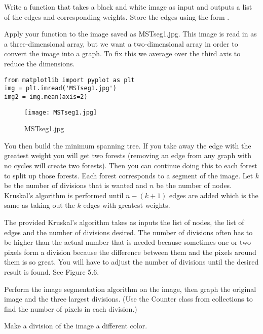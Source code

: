 \begin{problem}
Write a function that takes a black and white image as input and outputs a list of the edges and corresponding weights. Store the edges using the form .

Apply your function to the image saved as MSTseg1.jpg. This image is read in as a three-dimensional array, but we want a two-dimensional array in order to convert the image into a graph. To fix this we average over the third axis to reduce the dimensions.
\begin{lstlisting}
from matplotlib import pyplot as plt
img = plt.imread('MSTseg1.jpg')
img2 = img.mean(axis=2)
\end{lstlisting}

\begin{figure}[H]
\texttt{[image: MSTseg1.jpg]}
\caption{MSTseg1.jpg}
\end{figure}

\end{problem}


You then build the minimum spanning tree. If you take away the edge with the greatest weight you will get two forests (removing an edge from any graph with no cycles will create two forests). Then you can continue doing this to each forest to split up those forests. Each forest corresponds to a segment of the image.
Let $k$ be the number of divisions that is wanted and $n$ be the number of nodes.
Kruskal's algorithm is performed until $n-(k+1)$ edges are added which is the same as taking out the $k$ edges with greatest weights.


The provided Kruskal's algorithm takes as inputs the list of nodes, the list of edges and the number of divisions desired.
The number of divisions often has to be higher than the actual number that is needed because sometimes one or two pixels form a division because the difference between them and the pixels around them is so great.
You will have to adjust the number of divisions until the desired result is found.  See Figure 5.6.

\begin{problem}
Perform the image segmentation algorithm on the image, then graph the original image and the three largest divisions.
(Use the Counter class from collections to find the number of pixels in each division.)
\end{problem}

\begin{problem}
Make a division of the image a different color.
\end{problem}


